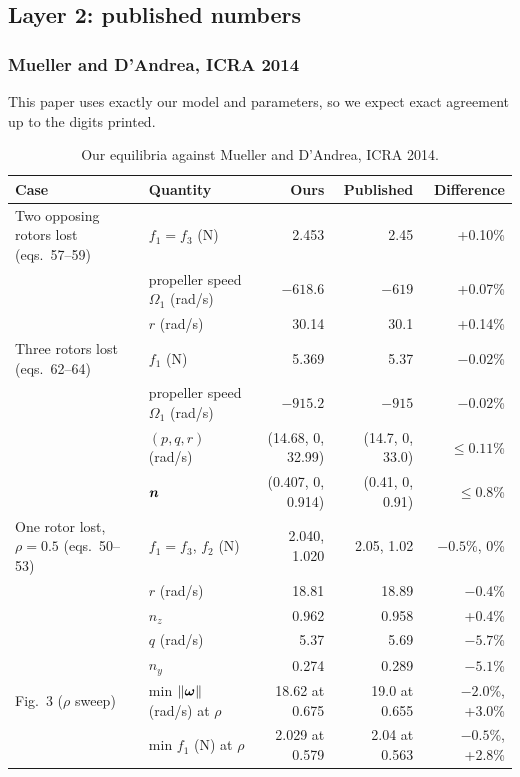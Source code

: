 \subsection{Layer 2: published numbers}
\subsubsection{Mueller and D'Andrea, ICRA 2014}\label{sec:val-icra}
This paper uses exactly our model and parameters, so we expect exact agreement up to the digits printed.
\begin{table}[h]
\centering\small
\caption{Our equilibria against Mueller and D'Andrea, ICRA 2014.}\label{tab:val-icra}
\setlength{\tabcolsep}{4pt}
\begin{tabularx}{\linewidth}{>{\raggedright\arraybackslash}p{3.1cm} L r r r}
\toprule
Case & Quantity & Ours & Published & Difference \\
\midrule
Two opposing rotors lost (eqs.~57--59) & $f_1 = f_3$ (N) & 2.453 & 2.45 & +0.10\% \\
 & propeller speed $\Omega_1$ (rad/s) & $-618.6$ & $-619$ & +0.07\% \\
 & $r$ (rad/s) & 30.14 & 30.1 & +0.14\% \\
\midrule
Three rotors lost (eqs.~62--64) & $f_1$ (N) & 5.369 & 5.37 & $-0.02$\% \\
 & propeller speed $\Omega_1$ (rad/s) & $-915.2$ & $-915$ & $-0.02$\% \\
 & $(p, q, r)$ (rad/s) & (14.68, 0, 32.99) & (14.7, 0, 33.0) & $\le0.11$\% \\
 & $\boldsymbol{n}$ & (0.407, 0, 0.914) & (0.41, 0, 0.91) & $\le0.8$\% \\
\midrule
One rotor lost, $\rho = 0.5$ (eqs.~50--53) & $f_1 = f_3$, $f_2$ (N) & 2.040, 1.020 & 2.05, 1.02 & $-0.5$\%, 0\% \\
 & $r$ (rad/s) & 18.81 & 18.89 & $-0.4$\% \\
 & $n_z$ & 0.962 & 0.958 & +0.4\% \\
 & $q$ (rad/s) & 5.37 & 5.69 & $-5.7$\% \\
 & $n_y$ & 0.274 & 0.289 & $-5.1$\% \\
\midrule
Fig.~3 ($\rho$ sweep) & min $\|\boldsymbol{\omega}\|$ (rad/s) at $\rho$ & 18.62 at 0.675 & 19.0 at 0.655 & $-2.0$\%, +3.0\% \\
 & min $f_1$ (N) at $\rho$ & 2.029 at 0.579 & 2.04 at 0.563 & $-0.5$\%, +2.8\% \\
\bottomrule
\end{tabularx}
\end{table}

